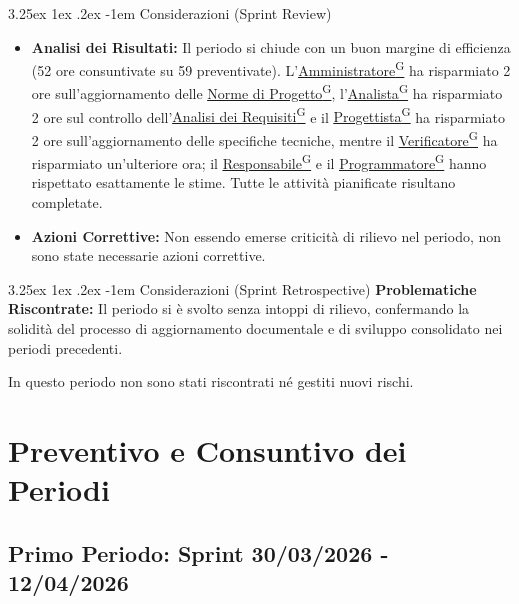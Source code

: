 \documentclass[a4paper,12pt]{article}
\makeatletter
\renewcommand\paragraph{\@startsection{paragraph}{5}{\z@}%
  {3.25ex \@plus1ex \@minus.2ex}%
  {-1em}%
  {\normalfont\normalsize\bfseries}}
\providecommand{\glslink}[2]{\href{https://alittlebyte-19.github.io/Documentazione/glossario.html\#gls-#1}{\underline{#2}\textsuperscript{\scriptsize G}}}
\makeatother
\begin{document}
\paragraph{Considerazioni (Sprint Review)}
\begin{itemize}
    \item \textbf{Analisi dei Risultati:} Il periodo si chiude con un buon margine di efficienza (52 ore consuntivate su 59 preventivate). L'\glslink{amministratore}{Amministratore} ha risparmiato 2 ore sull'aggiornamento delle \glslink{norme-di-progetto}{Norme di Progetto}, l'\glslink{analista}{Analista} ha risparmiato 2 ore sul controllo dell'\glslink{analisi-dei-requisiti-adr}{Analisi dei Requisiti} e il \glslink{progettista}{Progettista} ha risparmiato 2 ore sull'aggiornamento delle specifiche tecniche, mentre il \glslink{verificatore}{Verificatore} ha risparmiato un'ulteriore ora; il \glslink{responsabile}{Responsabile} e il \glslink{programmatore}{Programmatore} hanno rispettato esattamente le stime. Tutte le attività pianificate risultano completate.
    \item \textbf{Azioni Correttive:} Non essendo emerse criticità di rilievo nel periodo, non sono state necessarie azioni correttive.
\end{itemize}

\paragraph{Considerazioni (Sprint Retrospective)}
\textbf{Problematiche Riscontrate:} Il periodo si è svolto senza intoppi di rilievo, confermando la solidità del processo di aggiornamento documentale e di sviluppo consolidato nei periodi precedenti.

In questo periodo non sono stati riscontrati né gestiti nuovi rischi.

\newpage
\section{Preventivo e Consuntivo dei Periodi}
\label{sec:preventivo_e_consuntivo}
\subsection{Primo Periodo: Sprint 30/03/2026 - 12/04/2026}
\label{sec:pec_primoperiodo}

\vspace{0.5em}
\end{document}
